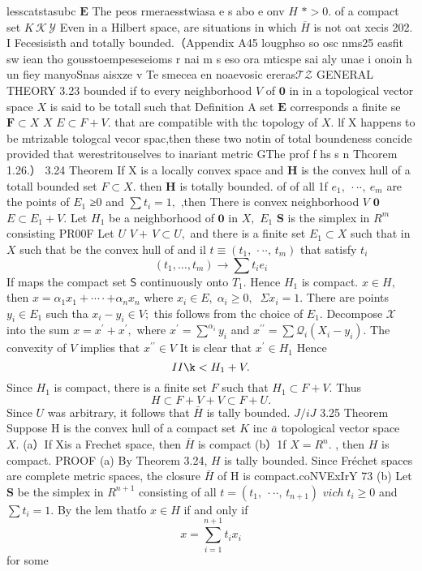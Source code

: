 lesscatstasubc ${\boldsymbol{E}}$ The peos rmeraesstwiasa e s abo e onv $\textstyle H$ $*>0.$ of a compact set $K\,{\mathcal{K}}\,{\mathcal{Y}}$ Even in a Hilbert space, are situations in which $\overline{{H}}$ is not oat xecis 202. I Fecesisisth and totally bounded.（Appendix A45 lougphso so osc nms25 easfit sw iean tho gousstoempeseseioms r nai m s eso ora mticspe sai aly unae i onoin h un fiey manyoSnas aisxze v Te smecea en noaevosic ereras${\mathcal{T}}{\mathcal{Z}}$ GENERAL THEORY 3.23 bounded if to every neighborhood ${\mathbf{}}V$ of ${\boldsymbol{0}}$ in in a topological vector space $\textstyle X$ is said to be totall such that Definition A set ${\boldsymbol{E}}$ corresponds a finite se ${\boldsymbol{F}}\subset X$ $X$ $E\subset F+V.$ that are compatible with thc topology of $X.$ lf X happens to be mtrizable tologcal vecor spac,then these two notin of total boundeness concide provided that werestritouselves to inariant metric GThe prof f hs s n Thcorem 1.26.） 3.24 Theorem If X is a locally convex space and ${\boldsymbol{H}}$ is the convex hull of a totall bounded set $F\subset X.$ then ${\boldsymbol{H}}$ is totally bounded. of of all 1f $e_{1},\ \cdot\cdot\cdot,\ e_{m}$ are the points of $E_{1}$ ≥0 and $\textstyle\sum t_{i}=1,$ ,then There is convex neighborhood ${\mathbf{}}V$ ${\boldsymbol{0}}$ $E\subset E_{1}+V.$ Let $\textstyle H_{1}$ be a neighborhood of $\mathbf{0}$ in $X,$ $E_{1}$ $\boldsymbol{S}$ is the simplex in $R^{m}$ consisting PR00F Let $U$ $V+\,V\subset U,$ and there is a finite set $E_{1}\subset X$ such that in $\textstyle X$ such that be the convex hull of and il $t\equiv\left(t_{1},\,\cdot\cdot\cdot,\,t_{m}\right)$ that satisfy ${\mathit{t}}_{i}$ $$ (t_{1},\ldots,t_{m})\to\sum t_{i}e_{i} $$ If maps the compact set $\boldsymbol{\mathsf{S}}$ continuously onto $T_{1}.$ Hence $\textstyle H_{1}$ is compact. $x\in H,$ then $x=\alpha_{1}x_{1}+\cdots\cdot+\alpha_{n}x_{n}$ where $x_{i}\in E,\;\alpha_{i}\geq0,\;\;\Sigma x_{i}=1.$ There are points $y_{i}\in E_{1}$ such tha $x_{i}-y_{i}\in V;$ this follows from thc choice of $E_{1}.$ Decompose $\scriptstyle{\mathcal{X}}$ into the sum $x=x^{\prime}+x^{\prime},$ where $x^{\prime}=\sum^{\alpha_{i}}y_{i}$ and $x^{\prime\prime}=\sum\!\mathcal{Q}_{i}(X_{i}-y_{i}).$ The convexity of ${\mathbf{}}V$ implies that $x^{\prime\prime}\in V$ It is clear that $x^{\prime}\in H_{1}$ Hence $$ I I\k<H_{1}+V. $$ Since $\textstyle H_{1}$ is compact, there is a finite set ${\mathbf{}}F$ such that $H_{1}\subset F+V.$ Thus $$ H\subset F+V+V\subset F+U. $$ Since $U$ was arbitrary, it follows that $\bar{H}$ is tally bounded. $J/i J$ 3.25 Theorem Suppose H is the convex hull of a compact set $\textstyle K$ inc $\bar{a}$ topological vector space $X.$ (a）If Xis a Frechet space, then $\overline{{H}}$ is compact (b）1f $X=R^{n}.$ , then $\textstyle H$ is compact. PROOF (a) By Theorem 3.24, $\textstyle H$ is tally bounded. Since Fréchet spaces are complete metric spaces, the closure $\bar{H}$ of H is compact.coNVExIrY 73 (b) Let $\boldsymbol{S}$ be the simplex in $R^{n+1}$ consisting of all $t=(t_{1},\ \cdot\cdot\cdot,\,t_{n+1})$ $\scriptstyle{v i c h\;}t_{i}\geq0$ and $\textstyle\sum t_{i}=1.$ By the lem thatfo $x\in H$ if and only if $$ x=\sum_{i=1}^{n+1}t_{i}x_{i} $$ for some 